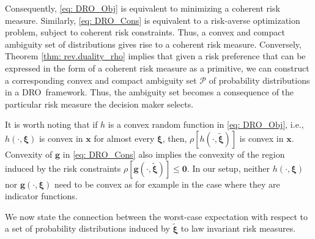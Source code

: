 \documentclass[final,onefignum,onetabnum]{class}
\newcommand{\ee}[2]{\mathbb{E}_{#1} \left[ #2 \right]}
\newcommand{\ro}[1]{\rho \left[ #1 \right]}
\newcommand{\bs}[1]{\boldsymbol{#1}} %
\newcommand{\Bs}[1]{\mathbb{#1}} %
\newcommand{\Cs}[1]{\mathcal{#1}} %
\newcommand{\txi}{\tilde{\bs{\xi}}}
\newcommand{\Pspace}[1]{\left( \Xi, \Cs{F}, #1 \right)}
\newcommand{\dro}{DRO}
\begin{document}
Consequently, \eqref{eq: DRO_Obj} is equivalent to minimizing a coherent risk measure. 
Similarly, \eqref{eq: DRO_Cons} is equivalent to a risk-averse optimization problem, subject to coherent risk constraints. 
Thus, a convex and compact ambiguity set of distributions gives rise to  a coherent risk measure.
Conversely, Theorem \ref{thm: rev.duality_rho} implies  that given a risk preference
that can be expressed in the form of a coherent risk
measure as a primitive, 
we can construct a corresponding convex and compact ambiguity set $\Cs{P}$ of probability distributions in a
\dro\ framework. Thus, the ambiguity set becomes a consequence of the particular
risk measure the decision maker selects.

It is worth noting that if $h$ is a convex random function in \eqref{eq: DRO_Obj}, i.e., $h(\cdot, \bs{\xi})$  is convex in $\bs{x}$ for almost every $\bs{\xi}$, then, $\ro{h(\cdot,\txi)}$ is convex in $\bs{x}$. Convexity of $\bs{g}$ in \eqref{eq: DRO_Cons} also implies the convexity of the  region induced by the risk constraints $\ro{\bs{g}(\cdot,\txi)} \le \bs{0}$. 
In our setup, neither $h(\cdot, \bs{\xi})$ nor $\bs{g}(\cdot, \bs{\xi})$ need to be convex as for example in the case where they are indicator functions. %


We now state the connection between the worst-case expectation with respect to a set of probability distributions induced by $\txi$ to law invariant risk measures. 
\begin{comment}
\begin{theorem}
	\label{thm: duality_rho_law}{\citet[Theorem~2.3]{shapiro2017DRSP}}
	Consider a probability space $\Pspace{Q}$, $\Cs{Z}$, $\Cs{Z}^{*}$, and $\Cs{D}$ as defined in Theorem \ref{thm: rev.duality_rho}.  %
	Consider  $\rho: \Cs{Z} \mapsto \Bs{R}$, defined as 
	$\rho(Z)= \sup_{P \in \Cs{P}} \ee{P}{Z}= \sup_{\zeta \in \Cs{M}} \ \langle Z,\zeta \rangle, \; \forall Z \in \Cs{Z},$
	with respect to a set $\Cs{P}$ of absolutely continuous probability measures with respect to $Q$ and its associated set of probability density functions $\Cs{M}=\sset*{\zeta=\frac{dP}{dQ}}{P \in \Cs{P}} \subset \Cs{D}$. 
	If the set $\Cs{M}$ is law invariant, then the corresponding risk measure $\rho$ is law invariant. Conversely, if the  risk measure $\rho$ is law invariant, and the set  $\Cs{M}$ is convex and weakly* closed, then the set $\Cs{M}$ is law invariant. 
\end{theorem}
\end{comment}
\end{document}
